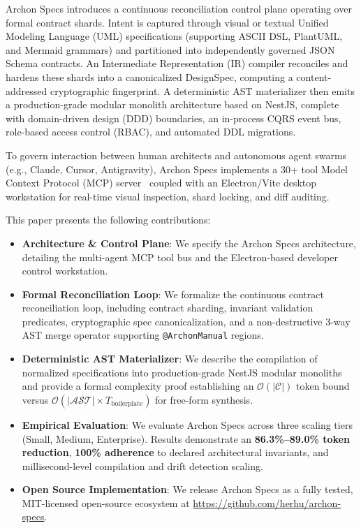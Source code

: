 Archon Specs introduces a continuous reconciliation control plane operating over formal contract shards. Intent is captured through visual or textual Unified Modeling Language (UML) specifications (supporting ASCII DSL, PlantUML, and Mermaid grammars) and partitioned into independently governed JSON Schema contracts. An Intermediate Representation (IR) compiler reconciles and hardens these shards into a canonicalized DesignSpec, computing a content-addressed cryptographic fingerprint. A deterministic AST materializer then emits a production-grade modular monolith architecture based on NestJS, complete with domain-driven design (DDD) boundaries, an in-process CQRS event bus, role-based access control (RBAC), and automated DDL migrations.

To govern interaction between human architects and autonomous agent swarms (e.g., Claude, Cursor, Antigravity), Archon Specs implements a 30+ tool Model Context Protocol (MCP) server~\cite{anthropic2024mcp} coupled with an Electron/Vite desktop workstation for real-time visual inspection, shard locking, and diff auditing.

This paper presents the following contributions:
\begin{itemize}[leftmargin=*]
  \item \textbf{Architecture \& Control Plane}: We specify the Archon Specs architecture, detailing the multi-agent MCP tool bus and the Electron-based developer control workstation.
  \item \textbf{Formal Reconciliation Loop}: We formalize the continuous contract reconciliation loop, including contract sharding, invariant validation predicates, cryptographic spec canonicalization, and a non-destructive 3-way AST merge operator supporting \texttt{@ArchonManual} regions.
  \item \textbf{Deterministic AST Materializer}: We describe the compilation of normalized specifications into production-grade NestJS modular monoliths and provide a formal complexity proof establishing an $\mathcal{O}(|\mathcal{C}|)$ token bound versus $\mathcal{O}(|\mathcal{AST}| \times T_{\text{boilerplate}})$ for free-form synthesis.
  \item \textbf{Empirical Evaluation}: We evaluate Archon Specs across three scaling tiers (Small, Medium, Enterprise). Results demonstrate an \textbf{86.3\%--89.0\% token reduction}, \textbf{100\% adherence} to declared architectural invariants, and millisecond-level compilation and drift detection scaling.
  \item \textbf{Open Source Implementation}: We release Archon Specs as a fully tested, MIT-licensed open-source ecosystem at \url{https://github.com/herhu/archon-specs}.
\end{itemize}


